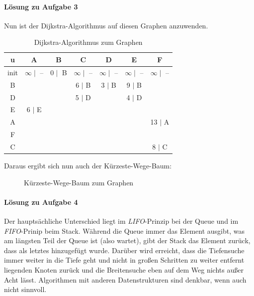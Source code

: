 \documentclass[11pt,a4paper]{scrartcl}
\begin{document}
\paragraph{Lösung zu Aufgabe 3}
\label{a6.3:lsg}
Nun ist der Dijkstra-Algorithmus auf diesen Graphen anzuwenden. 
\begin{table}[h]
\centering
\begin{tabular}{|c|c|c|c|c|c|c|}
\hline
u    & A 				& B 			& C 			& D 			& E 		& F \\
\hline
init & $\infty \mid$ -- 	& $0 \mid$ B &  $\infty \mid$ -- &  $\infty \mid$ --  &  $\infty \mid$ -- &  $\infty \mid$ --  \\
\hline
B 	&					&			& 6 $\mid$ B	& 3 $\mid$ B	& 9 $\mid$ B & \\
\hline
D	&					&			& 5 $\mid$ D&			& 4 $\mid$ D & \\
\hline
E   	& 6 $\mid$ E			&			&			&			&		&	\\
\hline
A	& 					&			&			&			&		& 13 $\mid$ A\\
\hline
F 	&					&			&			&			&		& \\
\hline
C 	&					&			&			&			&		& 8 $\mid$ C \\	
\hline	
\end{tabular}
\caption{Dijkstra-Algorithmus zum Graphen}
\end{table}
Daraus ergibt sich nun auch der Kürzeste-Wege-Baum:
\begin{figure}[h!]
\centering
{}
\caption{Kürzeste-Wege-Baum zum Graphen}
\end{figure}
\paragraph{Lösung zu Aufgabe 4}\label{a6.4:lsg}
Der hauptsächliche Unterschied liegt im \textit{LIFO}-Prinzip bei der Queue und im \textit{FIFO}-Prinip beim Stack. Während die Queue immer das Element ausgibt, was am längsten Teil der Queue ist (also wartet), gibt der Stack das Element zurück, dass als letztes hinzugefügt wurde. Darüber wird erreicht, dass die Tiefensuche immer weiter in die Tiefe geht und nicht in großen Schritten zu weiter entfernt liegenden Knoten zurück und die Breitensuche eben auf dem Weg nichts außer Acht lässt. Algorithmen mit anderen Datenstrukturen sind denkbar, wenn auch nicht sinnvoll.
\end{document}
